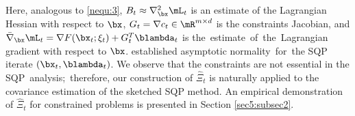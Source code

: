 Here, analogous to \eqref{nequ:3}, $B_t\approx \nabla_{\bx}^2\mL_t$ is an estimate of the Lagrangian Hessian with respect to $\bx$, $G_t = \nabla c_t\in\mR^{m\times d}$ is the constraints Jacobian, and $\bar{\nabla}_\bx\mL_t = \nabla F(\bx_t;\xi_t) + G_t^T\blambda_t$ is the~\mbox{estimate}~of~the~Lagrangian gradient with respect to $\bx$.
\cite{Na2022Statistical} established asymptotic normality~for~the SQP iterate $(\bx_t, \blambda_t)$. We observe that the constraints are not essential in the SQP~analysis;~\mbox{therefore}, our construction of $\hat{\Xi}_t$ is naturally applied to the covariance estimation of the sketched SQP method. An empirical demonstration of $\hat{\Xi}_t$ for constrained problems is presented in Section \ref{sec5:subsec2}.





